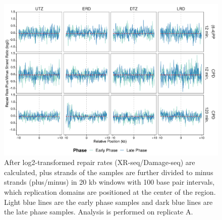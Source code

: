 \begin{figure}[H]
\begin{center}
\includegraphics[width=\textwidth]{Chapters/7_appendix/figures/supfig30}
\caption[Repair rate plus/minus phase ratio of replication domains in 20 kb (replicate A).]{After log2-transformed repair rates (XR-seq/Damage-seq) are calculated, plus strands of the samples are further divided to minus strands (plus/minus) in 20 kb windows with 100 base pair intervals, which replication domains are positioned at the center of the region. Light blue lines are the early phase samples and dark blue lines are the late phase samples. Analysis is performed on replicate A.}
\label{supfig:rrpm20repdomainA}
\end{center}
\end{figure}


